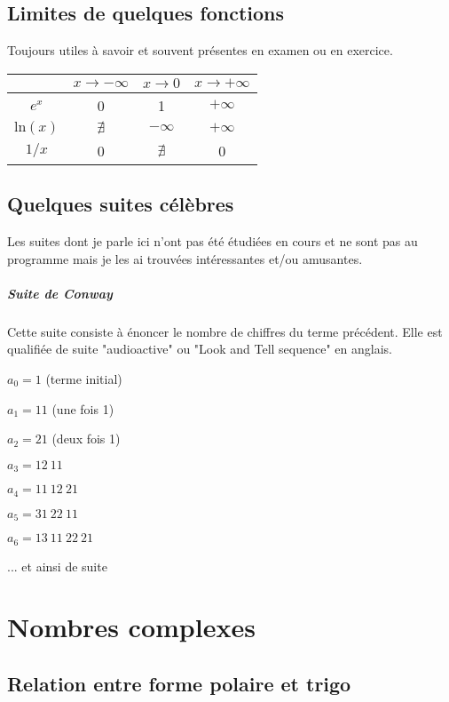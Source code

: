 \documentclass[10pt,a4paper]{book}
\begin{document}
\section{Limites de quelques fonctions}
Toujours utiles à savoir et souvent présentes en examen ou en exercice.\\
\begin{tabular}{ |c || c | c | c| }
\hline
 & $x\to-\infty$ & $x\to0$  & $x\to+\infty$ \\
 \hline 
 $e^x$ & 0 & 1 & $+\infty$ \\  
 $\text{ln}(x)$ & $\nexists$ & $-\infty$ & $+\infty$ \\
 $1/x$ & 0 & $\nexists$ & 0 \\
 \hline
\end{tabular}

\section{Quelques suites célèbres}
Les suites dont je parle ici n'ont pas été étudiées en cours et ne sont pas au programme mais je les ai trouvées intéressantes et/ou amusantes.
\paragraph{Suite de Conway}
Cette suite consiste à énoncer le nombre de chiffres du terme précédent.  Elle est qualifiée de suite "audioactive" ou "Look and Tell sequence" en anglais.\par 
$a_0 = 1$ (terme initial)\par 
$a_1 = 11$ (une fois 1)\par
$a_2 = 21$ (deux fois 1)\par 
$a_3 = 12\ 11$\par 
$a_4 = 11\ 12\ 21$\par 
$a_5 = 31\ 22\ 11$\par 
$a_6 = 13\ 11\ 22\ 21$\par 
... et ainsi de suite

\chapter{Nombres complexes}
\section{Relation entre forme polaire et trigo}
\end{document}
